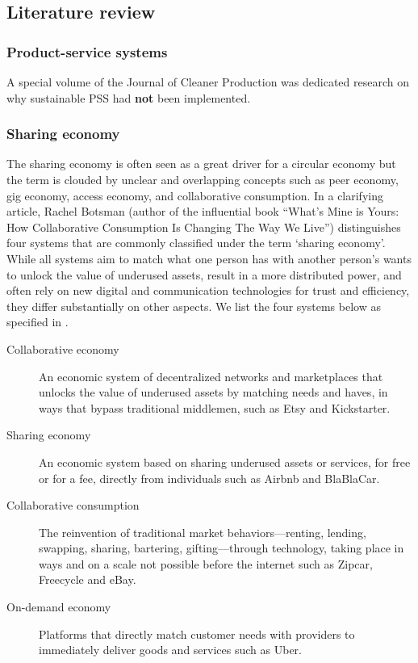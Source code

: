 \documentclass[a4paper,man,10pt]{apa6}
\begin{document}
\subsection{Literature review}\label{subsec:literature}


\subsubsection{Product-service systems}\label{subsubsec:PSS}
A special volume of the Journal of Cleaner Production was dedicated research on why sustainable PSS had \textbf{not} been implemented.


\subsubsection{Sharing economy}\label{subsubsec:sharing}
The sharing economy is often seen as a great driver for a circular economy but the term is clouded by unclear and overlapping concepts such as peer economy, gig economy, access economy, and collaborative consumption. 
In a clarifying article, Rachel Botsman (author of the influential book ``What's Mine is Yours: How Collaborative Consumption Is Changing The Way We Live''\citep{book:815976}) distinguishes four systems that are commonly classified under the term `sharing economy'. While all systems aim to match what one person has with another person's wants to unlock the value of underused assets, result in a more distributed power, and often rely on new digital and communication technologies for trust and efficiency, they differ substantially on other aspects. We list the four systems below as specified in \citep{Botsman2015}.

\begin{description}
\item[Collaborative economy] An economic system of decentralized networks and marketplaces that unlocks the value of underused assets by matching needs and haves, in ways that bypass traditional middlemen, such as Etsy and Kickstarter.
\item[Sharing economy] An economic system based on sharing underused assets or services, for free or for a fee, directly from individuals such as Airbnb and BlaBlaCar.
\item[Collaborative consumption] The reinvention of traditional market behaviors—renting, lending, swapping, sharing, bartering, gifting—through technology, taking place in ways and on a scale not possible before the internet such as Zipcar, Freecycle and eBay.
\item[On-demand economy] Platforms that directly match customer needs with providers to immediately deliver goods and services such as Uber.
\end{description}
\end{document}

